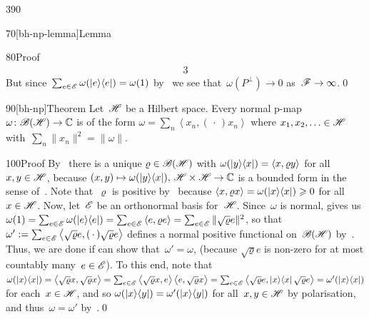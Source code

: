 \begin{parsec}{390}
\begin{point}{70}[bh-np-lemma]{Lemma}
\begin{point}{80}{Proof}
\begin{alignat*}{3}
\end{alignat*}
But since~$\sum_{e\in\mathscr{E}} \omega(\left|e\right>\!\left<e\right|)=\omega(1)$
by~
we see that~$\omega(P^\perp)\to0$
as~$\mathscr{F}\to\infty$.\qed
\end{point}
\end{point}
\begin{point}{90}[bh-np]{Theorem}%
%
Let~$\mathscr{H}$ be a Hilbert space.
Every normal p-map $\omega\colon \mathscr{B}(\mathscr{H})\to \mathbb{C}$
is of the form $\omega = \sum_n\left<x_n,(\,\cdot\,)x_n\right>$
where $x_1,x_2,\dotsc\in \mathscr{H}$
with~$\sum_n \|x_n\|^2=\|\omega\|$.
\begin{point}{100}{Proof}%
By~
there is a
unique
$\varrho\in\mathscr{B}(\mathscr{H})$
with $\omega(\left|y\right>\!\left<x\right|)=\left<x,\varrho y\right>$
for all~$x,y\in\mathscr{H}$,
because
$(x,y)\mapsto \omega(\left|y\right>\!\left<x\right|),\,
\mathscr{H}\times\mathscr{H}\to\mathbb{C}$
is a bounded form in the sense of~.
Note that~$\varrho$ 
is positive by~
because $\left<x,\varrho x\right>
=\omega(\left|x\right>\!\left<x\right|)\geqslant 0$
for all~$x\in\mathscr{H}$.
Now, let~$\mathscr{E}$ be an orthonormal basis for~$\mathscr{H}$.
Since~$\omega$ is normal,
 gives us
$\omega(1)=\sum_{e\in\mathscr{E}} \omega(\left|e\right>\!\left<e\right|)
= \sum_{e\in\mathscr{E}} \left<e,\varrho e\right>
= \sum_{e\in \mathscr{E}} \|\sqrt{\varrho} e\|^2$,
so that $\omega':=\sum_{e\in\mathscr{E}} \left<\sqrt{\varrho}e,(\,\cdot\,)
\sqrt{\varrho}e\right>$
defines a normal positive functional on~$\mathscr{B}(\mathscr{H})$
by~.
Thus,
we are done if
can show that~$\omega'=\omega$,
(because $\sqrt{\varrho}e$
is non-zero for at most countably many~$e\in\mathscr{E}$).
To this end,
note that
$\omega(\left|x\right>\!\left<x\right|)
= \left<\sqrt{\varrho}x,\sqrt{\varrho}x\right>
= \sum_{e\in \mathscr{E}}
\left<\sqrt{\varrho}x,e\right>
\left<e,\sqrt{\varrho}x\right>
= \sum_{e\in \mathscr{E}} \left< \sqrt{\varrho}e,
\left|x\right>\!\left<x\right| \sqrt{\varrho}e \right>
=\omega'(\left|x\right>\!\left<x\right|)$
for each~$x\in\mathscr{H}$,
and so $\omega(\left|x\right>\!\left<y\right|)=\omega'(\left|x\right>\!\left<y\right|)$
for all~$x,y\in\mathscr{H}$
by polarisation,
and thus~$\omega=\omega'$
by~.\qed
\end{point}
\end{point}
\end{parsec}
